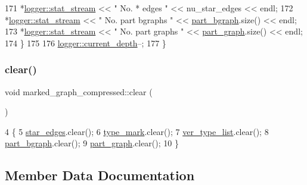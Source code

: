 \begin{DoxyCode}
171     *\hyperlink{classlogger_a7db37821f875f2ba3540980b355779f5}{logger::stat\_stream} << \textcolor{stringliteral}{" No. * edges       "} << nu\_star\_edges << endl;
172     *\hyperlink{classlogger_a7db37821f875f2ba3540980b355779f5}{logger::stat\_stream} << \textcolor{stringliteral}{" No. part bgraphs  "} << 
      \hyperlink{classmarked__graph__compressed_a7b3267063fba30b45eb21b3ba4e07536}{part\_bgraph}.size() << endl;
173     *\hyperlink{classlogger_a7db37821f875f2ba3540980b355779f5}{logger::stat\_stream} << \textcolor{stringliteral}{" No. part graphs   "} << 
      \hyperlink{classmarked__graph__compressed_ae179a4737e6eab905c18a94d44ef64b7}{part\_graph}.size() << endl;
174   \}
175 
176   \hyperlink{classlogger_a9d29b49bd318a719a8e85b59eac54fe0}{logger::current\_depth}--;
177 \}
\end{DoxyCode}
\mbox{\label{classmarked__graph__compressed_af58307bfadcaa4c3ca6dd594c2f9b3a9}} 
\subsubsection{\texorpdfstring{clear()}{clear()}}
{\footnotesize\ttfamily void marked\+\_\+graph\+\_\+compressed\+::clear (\begin{DoxyParamCaption}{ }\end{DoxyParamCaption})}


\begin{DoxyCode}
4 \{
5   \hyperlink{classmarked__graph__compressed_a7df5779d313486644132bd816937f532}{star\_edges}.clear();
6   \hyperlink{classmarked__graph__compressed_a86b00223525703e973415cbc9c94da68}{type\_mark}.clear();
7   \hyperlink{classmarked__graph__compressed_af2e3e55223d436628a02758dfae88493}{ver\_type\_list}.clear();
8   \hyperlink{classmarked__graph__compressed_a7b3267063fba30b45eb21b3ba4e07536}{part\_bgraph}.clear();
9   \hyperlink{classmarked__graph__compressed_ae179a4737e6eab905c18a94d44ef64b7}{part\_graph}.clear();
10 \}
\end{DoxyCode}


\subsection{Member Data Documentation}
\mbox{\label{classmarked__graph__compressed_a8b2aaac68e9332ddc78d88eb60b323a7}} 
